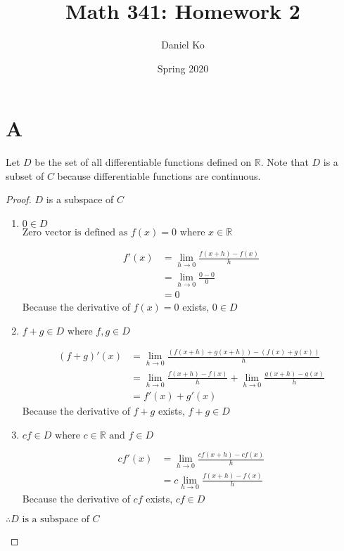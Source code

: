 \documentclass[11pt]{scrartcl}
\title{Math 341: Homework 2}
\author{Daniel Ko}
\date{Spring 2020}
\makeatletter
\newenvironment{Dequation}
  {%
  \def\tagform@##1{%
    \maketag@@@{\makebox[0pt][r]{(\ignorespaces##1\unskip\@@italiccorr)}}}%
  \ignorespaces
  }
  {%
  \def\tagform@##1{\maketag@@@{(\ignorespaces##1\unskip\@@italiccorr)}}%
  \ignorespacesafterend
  }
\makeatother
\begin{document}
\maketitle

\section{A}
Let $D$ be the set of all differentiable functions defined on $\mathbb{R}$. Note that $D$ is a subset of $C$ because differentiable functions are continuous.

\begin{proof}
$D$ is a subspace of $C$
\begin{enumerate}[label=\alph*.]
	\item{
			$0 \in D$\\
			$\text{Zero vector is defined as } f(x) = 0 \text{ where } x \in \mathbb{R} $
			\begin{Dequation}
			\begin{align*}
				f'(x) & = \lim_{h \to 0} \frac{f(x+h) - f(x)}{h}\\
					  & = \lim_{h \to 0} \frac{0 - 0}{0} \\
					  & = 0
			\end{align*}
			\end{Dequation}
			Because the derivative of $f(x) = 0$ exists, $0 \in D$
		}
	\item{
			$f + g \in D \text{ where } f,g \in D $
			\begin{Dequation}
			\begin{align*}
				(f + g)'(x) & = \lim_{h \to 0} \frac{(f(x+h) + g(x+h)) - (f(x)+g(x))}{h}\\
							& = \lim_{h \to 0} \frac{f(x+h) - f(x)}{h} + \lim_{h \to 0} \frac{g(x+h)-g(x)}{h}\\
					  & = f'(x) + g'(x)
			\end{align*}
			\end{Dequation}
			Because the derivative of $f + g$ exists, $f + g \in D$
		}
	\item{
			$cf \in D \text { where } c \in \mathbb{R} \text{ and } f \in D$
			\begin{Dequation}
			\begin{align*}
				cf'(x) & = \lim_{h \to 0} \frac{cf(x+h) - cf(x)}{h}\\
				& = c \lim_{h \to 0} \frac{f(x+h) - f(x)}{h}
			\end{align*}
			\end{Dequation}
			Because the derivative of $cf$ exists, $cf \in D$
		}
\end{enumerate}
\begin{center}
$\therefore D \text{ is a subspace of } C$
\end{center}
\end{proof}
\end{document}
